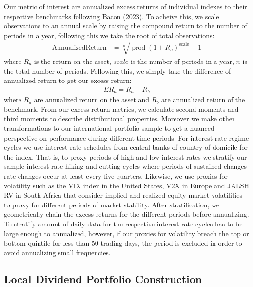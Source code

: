 \documentclass[11pt,preprint, authoryear]{elsarticle}
\numberwithin{equation}{section}
\numberwithin{figure}{section}
\numberwithin{table}{section}
\begin{document}
Our metric of interest are annualized excess returns of individual
indexes to their respective benchmarks following Bacon
(\protect\hyperlink{ref-bacon2023practical}{2023}). To acheive this, we
scale observations to an annual scale by raising the compound return to
the number of periods in a year, following this we take the root of
total observations: \begin{align*}
\operatorname{Annualized Return} & = \sqrt[n]{\operatorname{prod}\left(1+R_a\right)^{\operatorname{scale}}} - 1
\end{align*} where \(R_a\) is the return on the asset, \(scale\) is the
number of periods in a year, \(n\) is the total number of periods.
Following this, we simply take the difference of annualized return to
get our excess return: \begin{align*}
E R_a = R_{a} - R_{b}
\end{align*} where \(R_{a}\) are annualized return on the asset and
\(R_{b}\) are annualized return of the benchmark. From our excess return
metrics, we calculate second moments and third moments to describe
distributional properties. Moreover we make other transformations to our
international portfolio sample to get a nuanced perspective on
performance during different time periods. For interest rate regime
cycles we use interest rate schedules from central banks of country of
domicile for the index. That is, to proxy periods of high and low
interest rates we stratify our sample interest rate hiking and cutting
cycles where periods of sustained changes rate changes occur at least
every five quarters. Likewise, we use proxies for volatility such as the
VIX index in the United States, V2X in Europe and JALSH RV in South
Africa that consider implied and realized equity market volatilities to
proxy for different periods of market stability. After stratification,
we geometrically chain the excess returns for the different periods
before annualizing. To stratify amount of daily data for the respective
interest rate cycles has to be large enough to annualized, however, if
our proxies for volatility breach the top or bottom quintile for less
than 50 trading days, the period is excluded in order to avoid
annualizing small frequencies.

\hypertarget{local-dividend-portfolio-construction}{%
\subsection{Local Dividend Portfolio
Construction}\label{local-dividend-portfolio-construction}}
\end{document}
